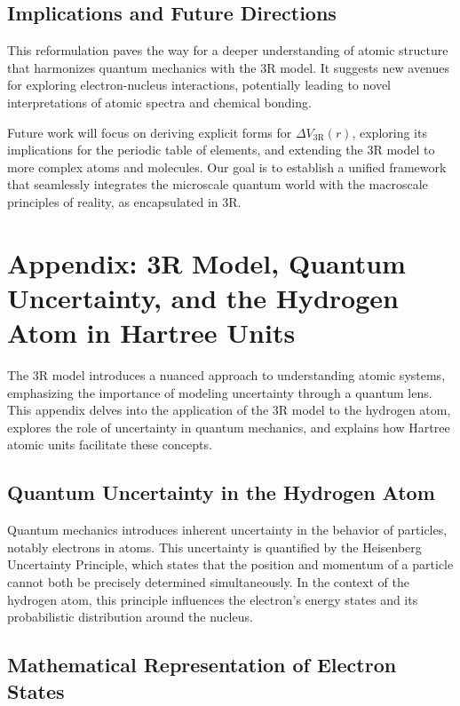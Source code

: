 \documentclass[12pt]{article}
\begin{document}
\subsection{Implications and Future Directions}

This reformulation paves the way for a deeper understanding of atomic structure that harmonizes quantum mechanics with the 3R model. It suggests new avenues for exploring electron-nucleus interactions, potentially leading to novel interpretations of atomic spectra and chemical bonding.

Future work will focus on deriving explicit forms for $\Delta V_{\text{3R}}(r)$, exploring its implications for the periodic table of elements, and extending the 3R model to more complex atoms and molecules. Our goal is to establish a unified framework that seamlessly integrates the microscale quantum world with the macroscale principles of reality, as encapsulated in 3R.


\section*{Appendix: 3R Model, Quantum Uncertainty, and the Hydrogen Atom in Hartree Units}

The 3R model introduces a nuanced approach to understanding atomic systems, emphasizing the importance of modeling uncertainty through a quantum lens. This appendix delves into the application of the 3R model to the hydrogen atom, explores the role of uncertainty in quantum mechanics, and explains how Hartree atomic units facilitate these concepts.

\subsection*{Quantum Uncertainty in the Hydrogen Atom}

Quantum mechanics introduces inherent uncertainty in the behavior of particles, notably electrons in atoms. This uncertainty is quantified by the Heisenberg Uncertainty Principle, which states that the position and momentum of a particle cannot both be precisely determined simultaneously. In the context of the hydrogen atom, this principle influences the electron's energy states and its probabilistic distribution around the nucleus.

\subsection*{Mathematical Representation of Electron States}
\end{document}
